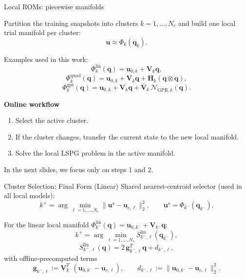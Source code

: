 \documentclass{beamer}
\begin{document}
\begin{frame}{Local ROMs: piecewise manifolds}
\small

Partition the training snapshots into clusters $k=1,\dots,N_c$ and build one local trial manifold per cluster:
\[
\mathbf u \approx \Phi_k(\mathbf q_k).
\]

Examples used in this work:
\[
\Phi_k^{\mathrm{lin}}(\mathbf q)
=
\mathbf u_{0,k}+\mathbf V_k\mathbf q,
\]
\[
\Phi_k^{\mathrm{quad}}(\mathbf q)
=
\mathbf u_{0,k}+\mathbf V_k\mathbf q+\mathbf H_k(\mathbf q\otimes\mathbf q),
\]
\[
\Phi_k^{\mathrm{gpr}}(\mathbf q)
=
\mathbf u_{0,k}+\mathbf V_k\mathbf q+\bar{\mathbf V}_k\,\mathcal N_{\mathrm{GPR},k}(\mathbf q).
\]

\vspace{0.3em}
\textbf{Online workflow}
\begin{enumerate}
    \item Select the active cluster.
    \item If the cluster changes, transfer the current state to the new local manifold.
    \item Solve the local LSPG problem in the active manifold.
\end{enumerate}

\vspace{0.3em}
In the next slides, we focus only on steps 1 and 2.

\end{frame}

\begin{frame}{Cluster Selection: Final Form (Linear)}
\small
Shared nearest-centroid selector (used in all local models):
\[
k^+=\arg\min_{\ell=1,\dots,N_c}\|\mathbf u^s-\mathbf u_{c,\ell}\|_2^2,
\qquad
\mathbf u^s=\Phi_{k^-}(\mathbf q_{k^-}).
\]

\vspace{0.2em}
For the linear local manifold $\Phi_{k^-}^{\mathrm{lin}}(\mathbf q)=\mathbf u_{0,k^-}+\mathbf V_{k^-}\mathbf q$:
\[
k^+=\arg\min_{\ell=1,\dots,N_c} S_{k^-,\ell}^{\mathrm{lin}}(\mathbf q_{k^-}),
\]
\[
S_{k^-,\ell}^{\mathrm{lin}}(\mathbf q)
=
2\,\mathbf g_{k^-,\ell}^T\mathbf q + d_{k^-,\ell},
\]
with offline-precomputed terms
\[
\mathbf g_{k^-,\ell}
:=
\mathbf V_{k^-}^T(\mathbf u_{0,k^-}-\mathbf u_{c,\ell}),
\qquad
d_{k^-,\ell}
:=
\|\mathbf u_{0,k^-}-\mathbf u_{c,\ell}\|_2^2.
\]
\end{frame}
\end{document}
